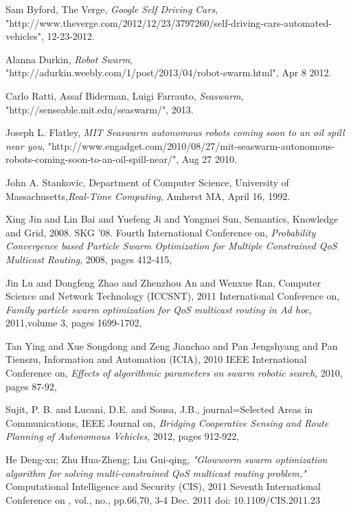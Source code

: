 \documentclass[journal]{IEEEtran}
\begin{document}
\ifCLASSOPTIONcaptionsoff
  \newpage
\fi
\begin{thebibliography}{1}

Sam Byford, The Verge, \emph{Google Self Driving Cars}, "http://www.theverge.com/2012/12/23/3797260/self-driving-cars-automated-vehicles", 12-23-2012.

Alanna Durkin, \emph{Robot Swarm}, "http://adurkin.weebly.com/1/post/2013/04/robot-swarm.html", Apr 8 2012.

Carlo Ratti, Assaf Biderman, Luigi Farrauto, \emph{Seaswarm}, "http://senseable.mit.edu/seaswarm/", 2013.

Joseph L. Flatley, \emph{MIT Seaswarm autonomous robots coming soon to an oil spill near you},
"http://www.engadget.com/2010/08/27/mit-seaswarm-autonomous-robots-coming-soon-to-an-oil-spill-near/", Aug 27 2010.

John A. Stankovic, Department of Computer Science, University of Massachusetts,\emph{Real-Time Computing}, Amherst MA, April 16, 1992.

Xing Jin and Lin Bai and Yuefeng Ji and Yongmei Sun,
Semantics, Knowledge and Grid, 2008. SKG '08. Fourth International Conference on, \emph{Probability Convergence based Particle Swarm Optimization for Multiple Constrained QoS Multicast Routing},
2008, pages 412-415,

Jin Lu and Dongfeng Zhao and Zhenzhou An and Wenxue Ran,
Computer Science and Network Technology (ICCSNT), 2011 International Conference on, \emph{Family particle swarm optimization for QoS multicast routing in Ad hoc},
2011,volume 3, pages 1699-1702,

Tan Ying and Xue Songdong and Zeng Jianchao and Pan Jengshyang and Pan Tienszu,
Information and Automation (ICIA), 2010 IEEE International Conference on, \emph{Effects of algorithmic parameters on swarm robotic search},
2010, pages 87-92,

Sujit, P. B. and Lucani, D.E. and Sousa, J.B.,
journal=Selected Areas in Communications, IEEE Journal on, \emph{Bridging Cooperative Sensing and Route Planning of Autonomous Vehicles},
2012, pages 912-922,

He Deng-xu; Zhu Hua-Zheng; Liu Gui-qing, \emph{"Glowworm swarm optimization algorithm for solving multi-constrained QoS multicast routing problem,"} Computational Intelligence and Security (CIS), 2011 Seventh International Conference on , vol., no., pp.66,70, 3-4 Dec. 2011
doi: 10.1109/CIS.2011.23


\end{thebibliography}
\end{document}
